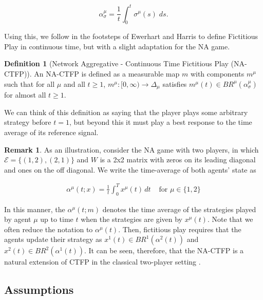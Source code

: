 \documentclass{article}
\theoremstyle{definition}
\newtheorem{definition}{Definition}
\newtheorem*{remark}{Remark}
\newcommand{\edgeset}{\mathcal{E}}
\newcommand{\weightset}{W}
\newcommand{\xmu}{x^{\mu}}
\newcommand{\refmu}{\sigma^{\mu}}
\newcommand{\avgref}[1]{\alpha_\sigma^{#1}}
\begin{document}
  \begin{equation}
    \avgref{\mu} = \frac{1}{t} \int_0^t \refmu(s) \; ds.
  \end{equation}

  Using this, we follow in the footsteps of Ewerhart \cite{} and Harris \cite{} to define
  Fictitious Play in continuous time, but with a slight adaptation for the NA game.
%
  \begin{definition}[Network Aggregative - Continuous Time Fictitious Play (NA-CTFP)]
    An NA-CTFP is defined as a measurable map $m$ with components $m^\mu$ such that for all $\mu$
    and all $t \geq 1$, $m^\mu: [0, \infty) \rightarrow \Delta_\mu$ satisfies $m^\mu(t) \in
    BR^\mu(\alpha_{\sigma}^\mu)$ for almost all $t \geq 1$.
  \end{definition}

  We can think of this definition as saying that the player plays some arbitrary strategy before
  $t = 1$, but beyond this it must play a best response to the time average of its reference
  signal.
  
  \begin{remark}
    As an illustration, consider the NA game with two players, in which $\edgeset = \{(1, 2),
    (2, 1)\}$ and $\weightset$ is a 2x2 matrix with zeros on its leading diagonal and ones on
    the off diagonal. We write the time-average of both agents' state as
  
    \begin{align}
      \alpha^\mu(t; x) = \frac{1}{t} \int_0^T \xmu(t) \, dt & \text{ for $\mu \in \{1, 2\}$}
    \end{align}

    In this manner, the $\alpha^\mu(t; m)$ denotes the time average of the strategies played by
    agent $\mu$ up to time $t$ when the strategies are given by $\xmu(t)$. Note that we often reduce the notation to $\alpha^\mu(t)$. Then, fictitious play requires that the agents update their
    strategy as $x^1(t) \in BR^1(\alpha^2(t))$ and $x^2(t) \in BR^2(\alpha^1(t))$. It can be
    seen, therefore, that the NA-CTFP is a natural extension of CTFP in the classical
    two-player setting \cite{}.
  \end{remark}

\subsection{Assumptions}
\end{document}

